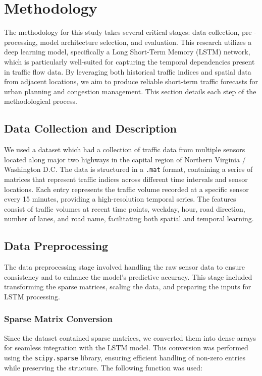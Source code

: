 \documentclass[conference]{IEEEtran}
\begin{document}
\section{Methodology}

The methodology for this study takes  several critical stages: data collection, pre - processing, model architecture selection, and evaluation. This research utilizes a deep learning model, specifically a Long Short-Term Memory (LSTM) network, which is particularly well-suited for capturing the temporal dependencies present in traffic flow data. By leveraging both historical traffic indices and spatial data from adjacent locations, we aim to produce reliable short-term traffic forecasts for urban planning and congestion management. This section details each step of the methodological process.

\subsection{Data Collection and Description}

We used a dataset which had a collection of traffic data from multiple sensors located along major two highways in the capital region of Northern Virginia / Washington D.C. The data is structured in a \texttt{.mat} format, containing a series of matrices that represent traffic indices across different time intervals and sensor locations. Each entry represents the traffic volume recorded at a specific sensor every 15 minutes, providing a high-resolution temporal series. The features consist of traffic volumes at recent time points, weekday, hour, road direction, number of lanes, and road name, facilitating both spatial and temporal learning.

\subsection{Data Preprocessing}

The data preprocessing stage involved handling the raw sensor data to ensure consistency and to enhance the model’s predictive accuracy. This stage included transforming the sparse matrices, scaling the data, and preparing the inputs for LSTM processing.

\subsubsection{Sparse Matrix Conversion}

Since the dataset contained sparse matrices, we converted them into dense arrays for seamless integration with the LSTM model. This conversion was performed using the \texttt{scipy.sparse} library, ensuring efficient handling of non-zero entries while preserving the structure. The following function was used:
\end{document}
